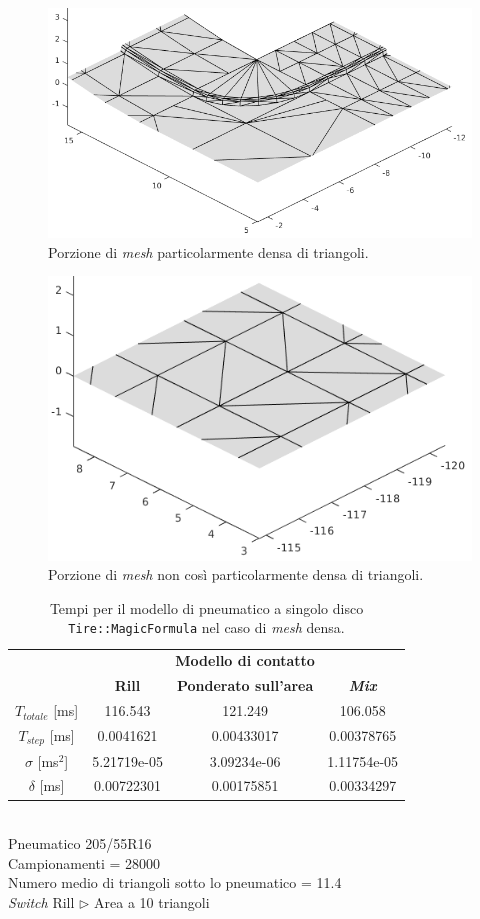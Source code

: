 \begin{figure}
	\centering
	\includegraphics[width=0.6\linewidth]{Figures/mesh_dense}
	\caption{Porzione di \textit{mesh} particolarmente densa di triangoli.}
	\label{meshdense}
\end{figure}
\begin{figure}
	\centering
	\includegraphics[width=0.6\linewidth]{Figures/mesh_notsodense}
	\caption{Porzione di \textit{mesh} non così particolarmente densa di triangoli.}
	\label{meshnotsodense}
\end{figure}
%
\clearpage
%
\begin{table}
	\centering
	\begin{tabular}{c|c|c|c|}
		\cline{2-4} 
		& \multicolumn{3}{c|}{\textbf{Modello di contatto}} \\
		\cline{2-4} 
		& \textbf{Rill} & \textbf{Ponderato sull'area} & \textbf{\textit{Mix}} \\ 
		\hline
		\multicolumn{1}{|c|}{$T_{totale}$ [ms]} & 116.543 & 121.249 & 106.058 \\ 
		\hline 
		\multicolumn{1}{|c|}{$T_{step}$ [ms]} & 0.0041621 & 0.00433017 & 0.00378765 \\ 
		\hline 
		\multicolumn{1}{|c|}{$\sigma$ [ms$^2$]} & 5.21719e-05 & 3.09234e-06 & 1.11754e-05 \\ 
		\hline 
		\multicolumn{1}{|c|}{$\delta$ [ms]} & 0.00722301 & 0.00175851 & 0.00334297 \\ 
		\hline 
	\end{tabular}
	\\[0.5cm]
	Pneumatico 205/55R16\\
	Campionamenti = 28000\\
	Numero medio di triangoli sotto lo pneumatico = 11.4\\
	\textit{Switch} Rill $\triangleright$ Area a 10 triangoli
	\caption{Tempi per il modello di pneumatico a singolo disco \texttt{Tire::MagicFormula} nel caso di \textit{mesh} densa.}
	\label{MFcordolo}
\end{table}
